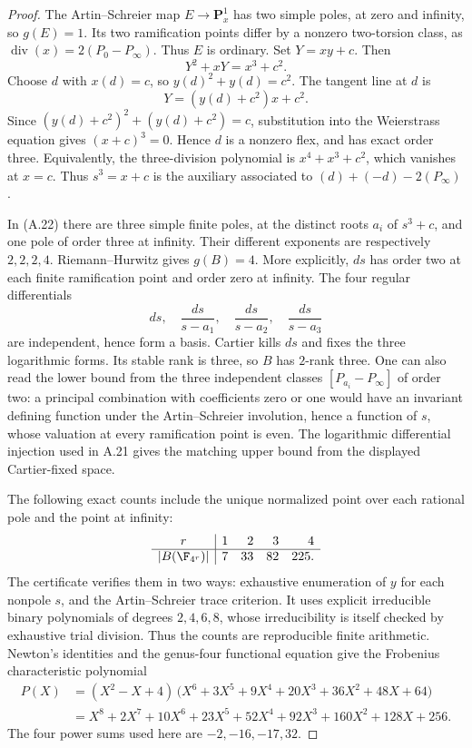 \begin{proof}
The Artin--Schreier map $E\to\mathbf P^1_x$ has two simple
poles, at zero and infinity, so $g(E)=1$. Its two ramification
points differ by a nonzero two-torsion class, as
$\operatorname{div}(x)=2(P_0-P_\infty)$. Thus $E$ is ordinary.
Set $Y=xy+c$. Then
\[
 Y^2+xY=x^3+c^2.
\]
Choose $d$ with $x(d)=c$, so $y(d)^2+y(d)=c^2$.
The tangent line at $d$ is
\[
 Y=(y(d)+c^2)x+c^2.
\]
Since $(y(d)+c^2)^2+(y(d)+c^2)=c$, substitution into the
Weierstrass equation gives $(x+c)^3=0$. Hence $d$ is a
nonzero flex, and has exact order three. Equivalently, the
three-division polynomial is $x^4+x^3+c^2$, which vanishes
at $x=c$. Thus $s^3=x+c$ is the auxiliary associated to
$(d)+(-d)-2(P_\infty)$.

In (A.22) there are three simple finite poles, at the distinct
roots $a_i$ of $s^3+c$, and one pole of order three at
infinity. Their different exponents are respectively
$2,2,2,4$. Riemann--Hurwitz gives $g(B)=4$. More explicitly,
$ds$ has order two at each finite ramification point and
order zero at infinity. The four regular differentials
\[
 ds,\quad \frac{ds}{s-a_1},\quad
 \frac{ds}{s-a_2},\quad\frac{ds}{s-a_3}
\]
are independent, hence form a basis. Cartier kills $ds$ and
fixes the three logarithmic forms. Its stable rank is three,
so $B$ has $2$-rank three. One can also read the lower bound
from the three independent classes $[P_{a_i}-P_\infty]$ of
order two: a principal combination with coefficients zero
or one would have an invariant defining function under the
Artin--Schreier involution, hence a function of $s$, whose
valuation at every ramification point is even. The logarithmic
differential injection used in A.21 gives the matching upper
bound from the displayed Cartier-fixed space.

The following exact counts include the unique normalized point
over each rational pole and the point at infinity:
\[
\begin{array}{c|rrrr}
 r&1&2&3&4\\ \hline
 |B(\F_{4^r})|&7&33&82&225.
\end{array}
\]
The certificate
 verifies
them in two ways: exhaustive enumeration of $y$ for each
nonpole $s$, and the Artin--Schreier trace criterion. It uses
explicit irreducible binary polynomials of degrees $2,4,6,8$,
whose irreducibility is itself checked by exhaustive trial
division. Thus the counts are reproducible finite arithmetic.
Newton's identities and the genus-four functional equation
give the Frobenius characteristic polynomial
\citep[II, Theorem 1.1]{A_Milne2008}
\[
\begin{split}
 P(X)&=(X^2-X+4)\,
 \bigl(X^6+3X^5+9X^4+20X^3+36X^2+48X+64\bigr)\\
 &=X^8+2X^7+10X^6+23X^5+52X^4+92X^3
                          +160X^2+128X+256.
\end{split}
\tag{A.23}
\]
The four power sums used here are $-2,-16,-17,32$.


\end{proof}
